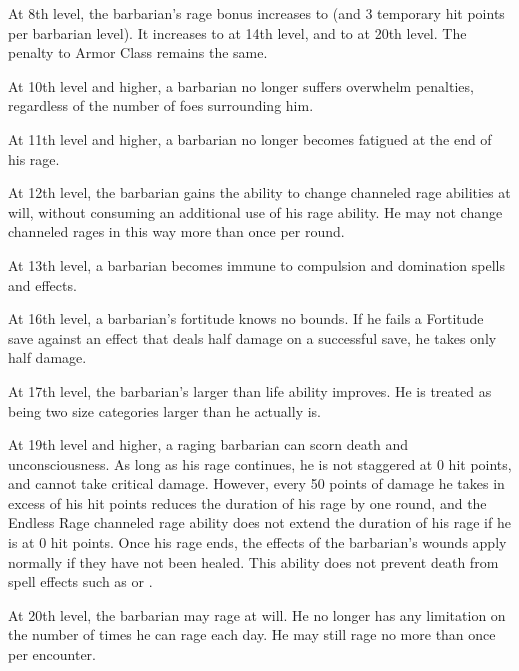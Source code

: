  At 8th level, the barbarian's rage bonus increases to  (and 3 temporary hit points per barbarian level). It increases to  at 14th level, and to  at 20th level. The penalty to Armor Class remains the same.

 At 10th level and higher, a barbarian no longer suffers overwhelm penalties, regardless of the number of foes surrounding him.

 At 11th level and higher, a barbarian no longer becomes fatigued at the end of his rage.

 At 12th level, the barbarian gains the ability to change channeled rage abilities at will, without consuming an additional use of his rage ability. He may not change channeled rages in this way more than once per round.

 At 13th level, a barbarian becomes immune to compulsion and domination spells and effects.

 At 16th level, a barbarian's fortitude knows no bounds. If he fails a Fortitude save against an effect that deals half damage on a successful save, he takes only half damage.

 At 17th level, the barbarian's larger than life ability improves. He is treated as being two size categories larger than he actually is.

 At 19th level and higher, a raging barbarian can scorn death and unconsciousness. As long as his rage continues, he is not staggered at 0 hit points, and cannot take critical damage. However, every 50 points of damage he takes in excess of his hit points reduces the duration of his rage by one round, and the Endless Rage channeled rage ability does not extend the duration of his rage if he is at 0 hit points. Once his rage ends, the effects of the barbarian's wounds apply normally if they have not been healed. This ability does not prevent death from spell effects such as  or .

 At 20th level, the barbarian may rage at will. He no longer has any limitation on the number of times he can rage each day. He may still rage no more than once per encounter.


